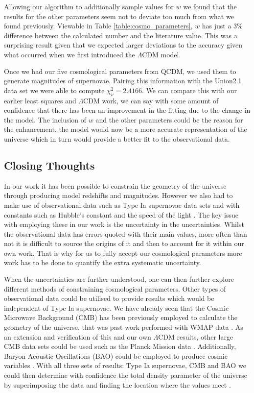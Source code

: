 \documentclass[twocolumn]{revtex4}
\begin{document}
{{{Allowing our algorithm to additionally sample values for $w$ we found that the results for the other parameters seem not to deviate too much from what we found previously. Viewable in Table \ref{table:cosmo_parameters}, $w$ has just a $3\%$ difference between the calculated number and the literature value. This was a surprising result given that we expected larger deviations to the accuracy given what occurred when we first introduced the $\Lambda$CDM model. 

Once we had our five cosmological parameters from QCDM, we used them to generate magnitudes of supernovae. Pairing this information with the Union2.1 data set we were able to compute $\chi^2_\nu= 2.4166$. We can compare this with our earlier least squares and $\Lambda$CDM work, we can say with some amount of confidence that there has been an improvement in the fitting due to the change in the model. The inclusion of $w$ and the other parameters could be the reason for the enhancement, the model would now be a more accurate representation of the universe which in turn would provide a better fit to the observational data. 

\vspace{-3ex}
\subsection{Closing Thoughts} 
\vspace{-2ex}
In our work it has been possible to constrain the geometry of the universe through producing model redshifts and magnitudes. However we also had to make use of observational data such as Type Ia supernovae data sets \cite{dataset_1, dataset_2} and with constants such as Hubble's constant \cite{hubble_constant} and the speed of the light \cite{speed_of_light}. The key issue with employing these in our work is the uncertainty in the uncertainties. Whilst the observational data has errors quoted with their main values, more often than not it is difficult to source the origins of it and then to account for it within our own work. That is why for us to fully accept our cosmological parameters more work has to be done to quantify the extra systematic uncertainty.

When the uncertainties are further understood, one can then further explore different methods of constraining cosmological parameters. Other types of observational data could be utilised to provide results which would be independent of Type Ia supernovae. We have already seen that the Cosmic Microwave Background (CMB) has been previously employed to calculate the geometry of the universe, that was past work performed with WMAP data \cite{mod_ast}. As an extension and verification of this and our own $\Lambda$CDM results, other large CMB data sets could be used such as the Planck Mission data \cite{cmb_cosmo}. Additionally, Baryon Acoustic Oscillations (BAO) could be employed to produce cosmic variables \cite{bao}. With all three sets of results: Type Ia supernovae, CMB and BAO we could then determine with confidence the total density parameter of the universe by superimposing the data and finding the location where the values meet \cite{dataset_2}.

}}}
\end{document}
